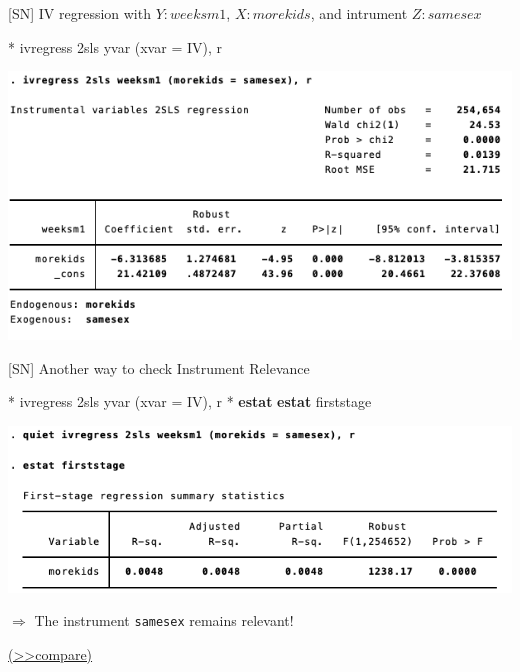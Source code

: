 \documentclass[
  10pt,
  ignorenonframetext,
]{beamer}
\newenvironment{Shaded}{\begin{snugshade}}{\end{snugshade}}
\newcommand{\FunctionTok}[1]{\textcolor[rgb]{0.00,0.00,0.00}{#1}}
\newcommand{\KeywordTok}[1]{\textcolor[rgb]{0.13,0.29,0.53}{\textbf{#1}}}
\newcommand{\NormalTok}[1]{#1}
\begin{document}
\begin{frame}[fragile]{{[}SN{]} IV regression with \(Y:weeksm1\),
\(X:morekids\), and intrument \(Z:samesex\)}
\protect\hypertarget{sn-iv-regression-with-yweeksm1-xmorekids-and-intrument-zsamesex}{}
\small

\begin{Shaded}
\begin{Highlighting}[]
\NormalTok{* ivregress 2sls yvar (xvar = IV), }\FunctionTok{r}
\end{Highlighting}
\end{Shaded}

\begin{center}\includegraphics[width=1\linewidth]{pictures/res3-ivregress} \end{center}
\end{frame}

\begin{frame}[fragile]{{[}SN{]} Another way to check Instrument
Relevance}
\protect\hypertarget{IVestatFirstStage}{}
\small

\begin{Shaded}
\begin{Highlighting}[]
\NormalTok{* ivregress 2sls yvar (xvar = IV), }\FunctionTok{r}
\NormalTok{* }\KeywordTok{estat} \KeywordTok{estat}\NormalTok{ firststage}
\end{Highlighting}
\end{Shaded}

\begin{center}\includegraphics[width=1\linewidth]{pictures/res4-estatFirstStage} \end{center}

\(\Rightarrow\) The instrument \texttt{samesex} remains relevant!

\footnotesize \protect\hyperlink{res2-regFirstStage}{(\textgreater\textgreater compare)}
\normalsize
\end{frame}
\end{document}
